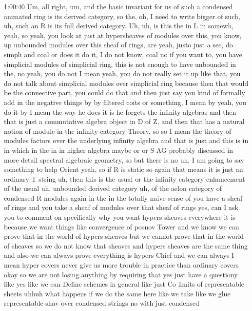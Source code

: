 \begin{unfinished}{1:00:40}   
    Um, all right, um, and the basic invariant for us of such a condensed animated ring is its derived category, 
so the, oh, I need to write bigger of such, uh, such an R is its full derived category. Uh, uh, is this the in L in somewh, yeah, 
so yeah, you look at just at hypersheaves of modules over this, you know, up unbounded modules over this sheaf of rings, are yeah, 
justo just a sec, do simpli and coal or does it do it, I do not know, coal no if you want to, you have simplicial modules of 
simplicial ring, this is not enough to have unbounded in the, no yeah, you do not I mean yeah, you do not really set it up like 
that, you do not talk about simplicial modules over simplicial ring because then that would be the connective part, you could do 
that and then just say you kind of formally add in the negative things by by filtered coits or something, I mean by yeah, you do 
it by I mean the way he does it is he forgets the infinity algebras and then that is  just a commutative algebra object in D of Z, 
and then that has a natural notion of module in the infinity category Theory, so so I mean the theory of modules factors over the 
underlying infinity algebra and that is  just and this is in in which in the in in higher algebra maybe or or S AG probably 
discussed in more detail spectral algebraic geometry, so but there is no uh, I am going to say something to help Orient yeah, 
so if R is static so again that means it is just an ordinary T string uh, then this is the usual or the infinity category 
enhancement of the usual uh, unbounded derived category uh, of the aelon category of condensed R modules again in the in the 
totally naive sense of you have a sheaf of rings and you take a sheaf of modules over that sheaf of rings yes, can I ask you to 
comment on specifically why you want hypers sheaves everywhere it is because we want things like convergence of posnov Tower 
and we know we can prove that in the world of hypers sheaves but we cannot prove that in the world of sheaves so we do not know 
that sheaves and hypers sheaves are the same thing and also we can always prove everything is hypers Chief and we can always 
I mean hyper covers never give us more trouble in practice than ordinary covers okay so we are not losing anything by requiring 
that yes just have a questiony like yes like we can Define schemes in general like just Co limits of representable sheets uhhuh 
what happens if we do the same here like we take like we glue representable shav over condensed strings no with just condensed 

\end{unfinished}
